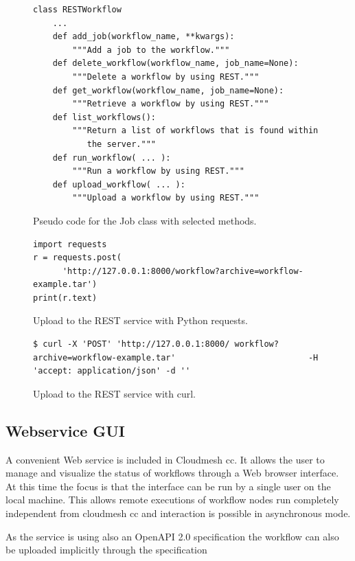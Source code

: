 \begin{figure}[t]
\begin{verbatim}
class RESTWorkflow
    ...
    def add_job(workflow_name, **kwargs):
        """Add a job to the workflow."""
    def delete_workflow(workflow_name, job_name=None):
        """Delete a workflow by using REST."""
    def get_workflow(workflow_name, job_name=None):
        """Retrieve a workflow by using REST."""
    def list_workflows():
        """Return a list of workflows that is found within
           the server."""
    def run_workflow( ... ):
        """Run a workflow by using REST."""
    def upload_workflow( ... ):
        """Upload a workflow by using REST."""
\end{verbatim}
\caption{Pseudo code for the Job class with selected methods.}
\label{fig:code-workflow-rest-commandline}

\bigskip

\begin{verbatim}
import requests
r = requests.post(
      'http://127.0.0.1:8000/workflow?archive=workflow-example.tar')
print(r.text)
\end{verbatim}
\caption{Upload to the REST service with Python requests.}
\label{fig:code-workflow-requests}

\bigskip

\begin{verbatim}
$ curl -X 'POST' 'http://127.0.0.1:8000/ workflow?archive=workflow-example.tar'                           -H 'accept: application/json' -d ''
\end{verbatim}%
\caption{Upload to the REST service with curl.}
\label{fig:code-workflow-curl}

\end{figure}


\subsection{Webservice GUI}

A convenient Web service is included in Cloudmesh cc. It allows the user
to manage and visualize the status of workflows through a Web browser
interface. At this time the focus is that the interface can be run by a
single user on the local machine. This allows remote executions of
workflow nodes run completely independent from cloudmesh cc and
interaction is possible in asynchronous mode.

As the service is using also an OpenAPI 2.0 specification the workflow
can also be uploaded implicitly through the specification

